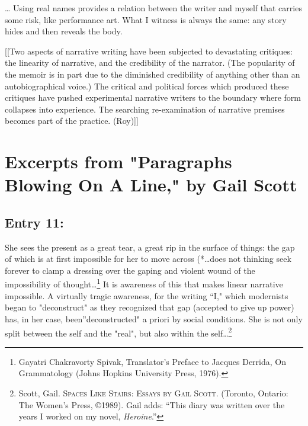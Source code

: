 \documentclass[
]{memoir}
\begin{document}
\ldots{} Using real names provides a relation between the writer and
myself that carries some risk, like performance art. What I witness is
always the same: any story hides and then reveals the body.

{[}{[}Two aspects of narrative writing have been subjected to
devastating critiques: the linearity of narrative, and the credibility
of the narrator. (The popularity of the memoir is in part due to the
diminished credibility of anything other than an autobiographical
voice.) The critical and political forces which produced these critiques
have pushed experimental narrative writers to the boundary where form
collapses into experience. The searching re-examination of narrative
premises becomes part of the practice. (Roy){]}{]}

\hypertarget{excerpts-from-paragraphs-blowing-on-a-line-by-gail-scott}{%
\section*{Excerpts from "Paragraphs Blowing On A Line," by Gail
Scott}\label{excerpts-from-paragraphs-blowing-on-a-line-by-gail-scott}}

\hypertarget{entry-11}{%
\subsection*{Entry 11:}\label{entry-11}}

She sees the present as a great tear, a great rip in the surface of
things: the gap of which is at first impossible for her to move across
(*\ldots{}does not thinking seek forever to clamp a dressing over the
gaping and violent wound of the impossibility of
thought\ldots{}\footnote{Gayatri Chakravorty Spivak, Translator's
  Preface to Jacques Derrida, On Grammatology (Johns Hopkins University
  Press, 1976).} It is awareness of this that makes linear narrative
impossible. A virtually tragic awareness, for the writing ``I," which
modernists began to "deconstruct" as they recognized that gap (accepted
to give up power) has, in her case, been''deconstructed" a priori by
social conditions. She is not only split between the self and the
"real", but also within the self\ldots{}\footnote{Scott, Gail.
  \textsc{Spaces Like Stairs: Essays by Gail Scott}. (Toronto, Ontario:
  The Women's Press, ©1989). Gail adds: ``This diary was written over
  the years I worked on my novel, \emph{Heroine}.''}
\end{document}

